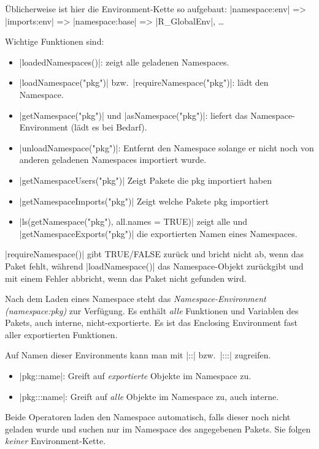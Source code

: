 \documentclass[10pt,twocolumn]{scrartcl}
\renewcommand{\lstinline}{\mycoloredinline}
\begin{document}
Üblicherweise ist hier die Environment-Kette so aufgebaut:
\lstinline|namespace:env| =>
\lstinline|imports:env| =>
\lstinline|namespace:base| =>
\lstinline|R_GlobalEnv|, \dots

Wichtige Funktionen sind:

\begin{itemize}
\item \lstinline|loadedNamespaces()|: zeigt alle geladenen Namespaces.
\item \lstinline|loadNamespace("pkg")| bzw.\ \lstinline|requireNamespace("pkg")|: lädt den Namespace.
\item \lstinline|getNamespace("pkg")| und \lstinline|asNamespace("pkg")|: liefert das Namespace-Environment (lädt es bei Bedarf).
\item \lstinline|unloadNamespace("pkg")|: Entfernt den Namespace solange er nicht noch von anderen geladenen Namespaces importiert wurde.
\item \lstinline|getNamespaceUsers("pkg")| Zeigt Pakete die pkg importiert haben
\item \lstinline|getNamespaceImports("pkg")| Zeigt welche Pakete pkg importiert
\item \lstinline|ls(getNamespace("pkg"), all.names = TRUE)| zeigt alle und \lstinline|getNamespaceExports("pkg")| die exportierten Namen eines Namespaces.
\end{itemize}

\lstinline|requireNamespace()| gibt TRUE/FALSE zurück und bricht nicht ab, wenn das Paket fehlt, während \lstinline|loadNamespace()| das Namespace-Objekt zurückgibt und mit einem Fehler abbricht, wenn das Paket nicht gefunden wird.

Nach dem Laden eines Namespace steht das \emph{Namespace-Environment (namespace:pkg)} zur Verfügung. Es enthält \emph{alle} Funktionen und Variablen des Pakets, auch interne, nicht-exportierte. Es ist das Enclosing Environment fast aller exportierten Funktionen.

Auf Namen dieser Environments kann man mit \lstinline|::| bzw.\ \lstinline|:::| zugreifen.

\begin{itemize}
\item \lstinline|pkg::name|: Greift auf \emph{exportierte} Objekte im Namespace zu.
\item \lstinline|pkg:::name|: Greift auf \emph{alle} Objekte im Namespace zu, auch interne.
\end{itemize}

Beide Operatoren laden den Namespace automatisch, falls dieser noch nicht geladen wurde und suchen nur im Namespace des angegebenen Pakets. Sie folgen \emph{keiner} Environment-Kette.
\end{document}
